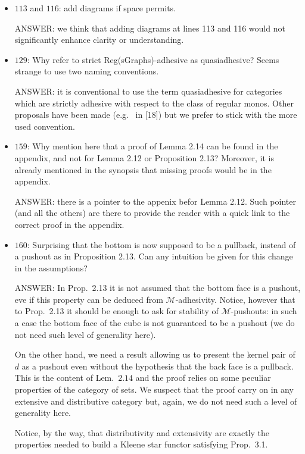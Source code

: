 \documentclass[english,11pt,a4paper]{article}
\begin{document}
\begin{itemize}
\item $113$ and $116$: add diagrams if space permits.

ANSWER: we think that adding diagrams at lines 113 and 116 would not  significantly enhance clarity or understanding.

\item $129$: Why refer to strict Reg(sGraphs)-adhesive as quasiadhesive? Seems strange to use two naming conventions.

ANSWER: it is conventional to use the term quasiadhesive for categories which are strictly adhesive with respect to the class of regular monos. Other proposals have been made (e.g.~ in [18]) but we prefer to stick with the more used convention.

\item $159$: Why mention here that a proof of Lemma 2.14 can be found in the appendix, and not for Lemma 2.12 or Proposition 2.13? Moreover, it is already mentioned in the synopsis that missing proofs would be in the appendix.

ANSWER: there is a pointer to the appenix befor Lemma 2.12. Such pointer (and all the others) are there to provide the reader with a quick link to the correct proof in the appendix.

\item $160$: Surprising that the bottom is now supposed to be a pullback, instead of a pushout as in Proposition 2.13. Can any intuition be given for this change in the assumptions?

ANSWER: In Prop.~2.13 it is not assumed that the bottom face is a pushout, eve if this property can be deduced from $\mathcal{M}$-adhesivity. Notice, however that to Prop.~2.13 it should be enough to ask for stability of $\mathcal{M}$-pushouts: in such a case the bottom face of the cube is not guaranteed to be a pushout (we do not need such level of generality here). 

On the other hand, we need a result allowing us to present the kernel pair of $d$ as a pushout even without the hypothesis that the back face is a pullback. This is the content of Lem.~$2.14$ and the proof relies on some peculiar properties of the category of sets. We suspect that the proof carry on in any extensive and distributive category but, again, we do not need such a level of generality here.

Notice, by the way, that distributivity and extensivity are exactly the properties needed to build a Kleene star functor satisfying Prop.~3.1.


\end{itemize}
\end{document}
